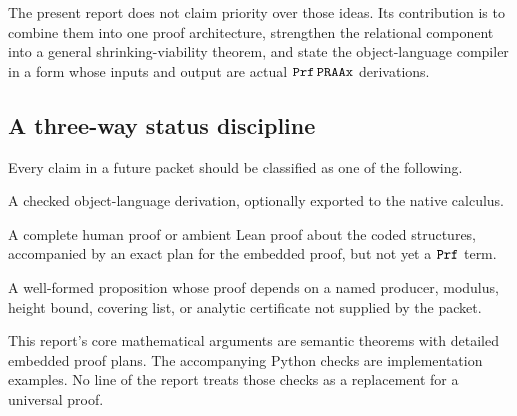 The present report does not claim priority over those ideas.  Its contribution
is to combine them into one proof architecture, strengthen the relational
component into a general shrinking-viability theorem, and state the
object-language compiler in a form whose inputs and output are actual
\(\texttt{Prf}\,\texttt{PRAAx}\) derivations.

\subsection{A three-way status discipline}

Every claim in a future packet should be classified as one of the following.

\begin{description}[leftmargin=3.4cm,style=nextline]
\item[Embedded theorem.] A checked object-language derivation, optionally exported to the native
      calculus.
\item[Semantic theorem.] A complete human proof or ambient Lean proof about
      the coded structures, accompanied by an exact plan for the embedded
      proof, but not yet a \(\texttt{Prf}\) term.
\item[Target or conditional theorem.] A well-formed proposition whose proof
      depends on a named producer, modulus, height bound, covering list, or
      analytic certificate not supplied by the packet.
\end{description}

This report's core mathematical arguments are semantic theorems with detailed
embedded proof plans.  The accompanying Python checks are implementation
examples.  No line of the report treats those checks as a replacement for a
universal proof.
